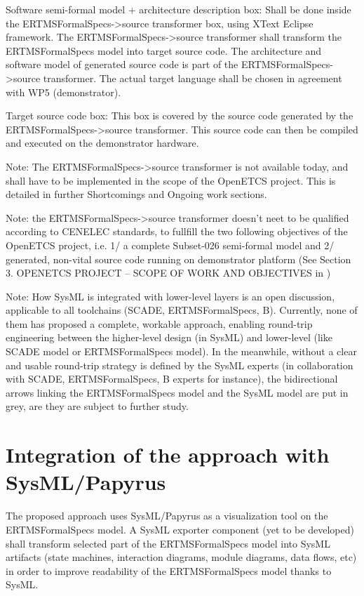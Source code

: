Software semi-formal model + architecture description box: Shall be done inside the ERTMSFormalSpecs->source transformer box, using XText Eclipse framework.
The ERTMSFormalSpecs->source transformer shall transform the ERTMSFormalSpecs model into target source code. The architecture and software model of generated source code is part of the ERTMSFormalSpecs->source transformer. The actual target language shall be chosen in agreement with WP5 (demonstrator).

Target source code box: This box is covered by the source code generated by the ERTMSFormalSpecs->source transformer. This source code can then be compiled and executed on the demonstrator hardware.

Note: The ERTMSFormalSpecs->source transformer is not available today, and shall have to be implemented in the scope of the OpenETCS project. This is detailed in further Shortcomings and Ongoing work sections.

Note: the ERTMSFormalSpecs->source transformer doesn't neet to be qualified according to CENELEC standards, to fullfill the two following objectives of the OpenETCS project, i.e. 1/ a complete Subset-026 semi-formal model and 2/ generated, non-vital source code running on demonstrator platform (See Section 3. OPENETCS PROJECT – SCOPE OF WORK AND OBJECTIVES in \citep{WP3_WP4_WP7_SafetyMeetingMinutes_April2013})

Note: How SysML is integrated with lower-level layers is an open discussion, applicable to all toolchains (SCADE, ERTMSFormalSpecs, B). Currently, none of them has proposed a complete, workable approach, enabling round-trip engineering between the higher-level design (in SysML) and lower-level (like SCADE model or ERTMSFormalSpecs model). In the meanwhile, without a clear and usable round-trip strategy is defined by the SysML experts (in collaboration with SCADE, ERTMSFormalSpecs, B experts for instance), the bidirectional arrows linking the ERTMSFormalSpecs model and the SysML model are put in grey, are they are subject to further study.

\section{Integration of the approach with SysML/Papyrus}

The proposed approach uses SysML/Papyrus as a visualization tool on the ERTMSFormalSpecs model. A SysML exporter component (yet to be developed) shall transform selected part of the ERTMSFormalSpecs model into SysML artifacts (state machines, interaction diagrams, module diagrams, data flows, etc) in order to improve readability of the ERTMSFormalSpecs model thanks to SysML. 

